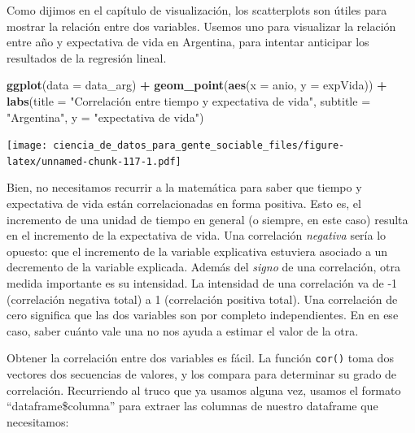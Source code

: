 \documentclass[spanish,]{book}
\newenvironment{Shaded}{\begin{snugshade}}{\end{snugshade}}
\newcommand{\DataTypeTok}[1]{\textcolor[rgb]{0.13,0.29,0.53}{#1}}
\newcommand{\KeywordTok}[1]{\textcolor[rgb]{0.13,0.29,0.53}{\textbf{#1}}}
\newcommand{\NormalTok}[1]{#1}
\newcommand{\OperatorTok}[1]{\textcolor[rgb]{0.81,0.36,0.00}{\textbf{#1}}}
\newcommand{\StringTok}[1]{\textcolor[rgb]{0.31,0.60,0.02}{#1}}
\begin{document}
Como dijimos en el capítulo de visualización, los scatterplots son útiles para mostrar la relación entre dos variables. Usemos uno para visualizar la relación entre año y expectativa de vida en Argentina, para intentar anticipar los resultados de la regresión lineal.

\begin{Shaded}
\begin{Highlighting}[]
\KeywordTok{ggplot}\NormalTok{(}\DataTypeTok{data =}\NormalTok{ data_arg) }\OperatorTok{+}\StringTok{ }
\StringTok{    }\KeywordTok{geom_point}\NormalTok{(}\KeywordTok{aes}\NormalTok{(}\DataTypeTok{x =}\NormalTok{ anio, }\DataTypeTok{y =}\NormalTok{ expVida)) }\OperatorTok{+}
\StringTok{    }\KeywordTok{labs}\NormalTok{(}\DataTypeTok{title =} \StringTok{"Correlación entre tiempo y expectativa de vida"}\NormalTok{,}
         \DataTypeTok{subtitle =} \StringTok{"Argentina"}\NormalTok{,}
         \DataTypeTok{y =} \StringTok{"expectativa de vida"}\NormalTok{)}
\end{Highlighting}
\end{Shaded}

\texttt{[image: ciencia\_de\_datos\_para\_gente\_sociable\_files/figure-latex/unnamed-chunk-117-1.pdf]}

Bien, no necesitamos recurrir a la matemática para saber que tiempo y expectativa de vida están correlacionadas en forma positiva. Esto es, el incremento de una unidad de tiempo en general (o siempre, en este caso) resulta en el incremento de la expectativa de vida. Una correlación \emph{negativa} sería lo opuesto: que el incremento de la variable explicativa estuviera asociado a un decremento de la variable explicada. Además del \emph{signo} de una correlación, otra medida importante es su intensidad. La intensidad de una correlación va de -1 (correlación negativa total) a 1 (correlación positiva total). Una correlación de cero significa que las dos variables son por completo independientes. En en ese caso, saber cuánto vale una no nos ayuda a estimar el valor de la otra.

Obtener la correlación entre dos variables es fácil. La función \texttt{cor()} toma dos vectores dos secuencias de valores, y los compara para determinar su grado de correlación. Recurriendo al truco que ya usamos alguna vez, usamos el formato ``dataframe\$columna'' para extraer las columnas de nuestro dataframe que necesitamos:

\begin{Shaded}
\end{Shaded}
\end{document}
